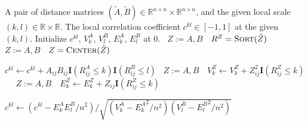 \documentclass[11pt]{article}
\providecommand{\sct}[1]{{\normalfont\textsc{#1}}}
\providecommand{\mb}[1]{\boldsymbol{#1}}
\newcommand{\Real}{\mathbb{R}}
\newcommand{\G}{c}
\newcommand{\Linefor}[2]{%
    \State \algorithmicfor\ {#1}\ \algorithmicdo\ {#2} \algorithmicend\ \algorithmicfor%
}
\newcommand{\Mgc}{\sct{Mgc}}
\newcommand{\rto}{\leftarrow}
\begin{document}
\begin{algorithm}
\caption{Local Correlation Computation for One Scale. This algorithm runs in $O(n^2)$ once the rank information is provided, which is suitable for \Mgc~computation if an optimal scale is already estimated. But it would take $O(n^4)$ if used to compute all local correlations. Note that for the default \Mgc~implementation by single centering, the centering function centers $\tilde{A}$ by column and $\tilde{B}$ by row, and the sorting function sorts $\tilde{A}$ within column and $\tilde{B}$ within row.}
\label{alg:1scale}
\begin{algorithmic}[1]
\Require A pair of distance matrices $(\tilde{A},\tilde{B}) \in \Real^{n \times n} \times \Real^{n \times n}$, and the given local scale $(k,l) \in \Real \times \Real$.
\Ensure The local correlation coefficient $\G^{kl} \in [-1,1]$ at the given $(k,l)$.
\State Initialize $\G^{kl}$, $V^{A}_{k}$, $V^{B}_{l}$, $E^{A}_{k}$, $E^{B}_{l}$ at $0$.
\Linefor{$Z:=A,B$}{$R^{Z}=\textsc{Sort}(\tilde{Z})$} 
\Linefor{$Z:=A,B$}{$Z=\textsc{Center}(\tilde{Z})$}  

\State $\G^{kl} \rto \G^{kl}+A_{ij}B_{ij}\mb{I}(R^{A}_{ij} \leq k)\mb{I}(R^{B}_{ij} \leq l)$ 
\Linefor{$Z:=A,B$}{$V^{Z}_{k} \rto V^{Z}_{k}+Z_{ij}^2\mb{I}(R^{Z}_{ij} \leq k)$} 
\Linefor{$Z:=A,B$}{$E^{Z}_{k} \rto E^{Z}_{k}+Z_{ij}\mb{I}(R^{Z}_{ij} \leq k)$} 
\EndFor

\State $\G^{kl} \rto \left(\G^{kl}-E^{A}_{k}E^{B}_{l}/n^2\right)/\sqrt{\left(V^{A}_{k}-{E^{A}_{k}}^2/n^2\right) \left(V^{B}_{l}-{E^{B}_{l}}^2/n^2\right)}$  

\EndFunction
\end{algorithmic}
\end{algorithm} 
\end{document}
